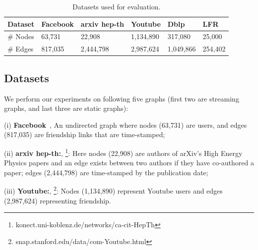 \begin{table}[]
\centering
\caption{Datasets used for evaluation.}
\label{tab:data}
\begin{tabular}{l l l l l l}
\hline
Dataset  & Facebook & arxiv hep-th & Youtube   & Dblp      & LFR     \\ \hline
\# Nodes & 63,731   & 22,908       & 1,134,890 & 317,080   & 25,000  \\ 
\# Edges & 817,035  & 2,444,798    & 2,987,624 & 1,049,866 & 254,402 \\ \hline
\end{tabular}
\vspace{3mm}
\end{table}



\subsection{Datasets}\label{sec:dataset}

We perform our experiments on following five graphs  (first two are streaming graphs, and last three are static graphs):  

(i) {\bf Facebook}~\cite{d1}, 
An undirected graph where nodes (63,731) are users, and edges (817,035) are friendship links that are time-stamped;  %

(ii) {\bf arxiv hep-th:}, 
 \footnote{konect.uni-koblenz.de/networks/ca-cit-HepTh}: 
Here nodes (22,908) are authors of arXiv's High Energy Physics papers and an edge exists between two authors if they have co-authored a paper; edges (2,444,798) are time-stamped by the publication date;%
 
 (iii) {\bf Youtube:}, 
\footnote{snap.stanford.edu/data/com-Youtube.html}:
Nodes (1,134,890) represent Youtube users and edges (2,987,624) representing friendship.

